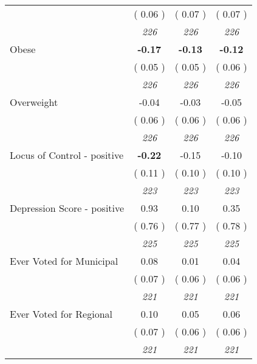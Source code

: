 \begin{tabular}{l c c c}
& (     0.06 ) & (     0.07 ) & (     0.07 ) \\
& \textit{ 226 } & \textit{ 226 } & \textit{ 226 } \\
Obese & \textbf{     -0.17 } & \textbf{     -0.13 } & \textbf{     -0.12 } \\
& (     0.05 ) & (     0.05 ) & (     0.06 ) \\
& \textit{ 226 } & \textit{ 226 } & \textit{ 226 } \\
Overweight &     -0.04 &     -0.03 &     -0.05 \\
& (     0.06 ) & (     0.06 ) & (     0.06 ) \\
& \textit{ 226 } & \textit{ 226 } & \textit{ 226 } \\
Locus of Control - positive & \textbf{     -0.22 } &     -0.15 &     -0.10 \\
& (     0.11 ) & (     0.10 ) & (     0.10 ) \\
& \textit{ 223 } & \textit{ 223 } & \textit{ 223 } \\
Depression Score - positive &      0.93 &      0.10 &      0.35 \\
& (     0.76 ) & (     0.77 ) & (     0.78 ) \\
& \textit{ 225 } & \textit{ 225 } & \textit{ 225 } \\
Ever Voted for Municipal &      0.08 &      0.01 &      0.04 \\
& (     0.07 ) & (     0.06 ) & (     0.06 ) \\
& \textit{ 221 } & \textit{ 221 } & \textit{ 221 } \\
Ever Voted for Regional &      0.10 &      0.05 &      0.06 \\
& (     0.07 ) & (     0.06 ) & (     0.06 ) \\
& \textit{ 221 } & \textit{ 221 } & \textit{ 221 } \\
\bottomrule
\end{tabular}
